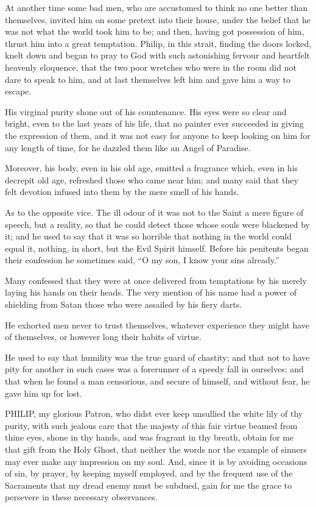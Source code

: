 At another time some bad men,
who are accustomed to think no one better than themselves, invited him
on some pretext into their house, under the belief that he was not what
the world took him to be; and then, having got possession of him, thrust
him into a great temptation. Philip, in this strait, finding the doors
locked, knelt down and began to pray to God with such astonishing
fervour and heartfelt heavenly eloquence, that the two poor wretches who
were in the room did not dare to speak to him, and at last themselves
left him and gave him a way to escape.

His virginal purity shone out of
his countenance. His eyes were so clear and bright, even to the last
years of his life, that no painter ever succeeded in giving the
expression of them, and it was not easy for anyone to keep looking on
him for any length of time, for he dazzled them like an Angel of
Paradise.

Moreover, his body, even in his
old age, emitted a fragrance which, even in his decrepit old age,
refreshed those who came near him; and many said that they felt devotion
infused into them by the mere smell of his hands.

As to the opposite vice. The ill
odour of it was not to the Saint a mere figure of speech, but a reality,
so that he could detect those whose souls were blackened by it; and he
used to say that it was so horrible that nothing in the world could
equal it, nothing, in short, but the Evil Spirit himself. Before his penitents began their confession he sometimes said, ``O my son, I
know your sins already.''

Many confessed that they were at
once delivered from temptations by his merely laying his hands on their
heads. The very mention of his name had a power of shielding from Satan
those who were assailed by his fiery darts.

He exhorted men never to trust
themselves, whatever experience they might have of themselves, or
however long their habits of virtue.

He used to say that humility was
the true guard of chastity; and that not to have pity for another in
such cases was a forerunner of a speedy fall in ourselves; and that when
he found a man censorious, and secure of himself, and without fear, he
gave him up for lost.


PHILIP, my glorious
Patron, who didst ever keep unsullied the white lily of thy purity, with
such jealous care that the majesty of this fair virtue beamed from thine
eyes, shone in thy hands, and was fragrant in thy breath, obtain for me
that gift from the Holy Ghost, that neither the words nor the example of
sinners may ever make any impression on my soul. And, since it is by
avoiding occasions of sin, by prayer, by keeping myself employed, and by
the frequent use of the Sacraments that my dread enemy must be subdued,
gain for me the grace to persevere in these necessary observances.

